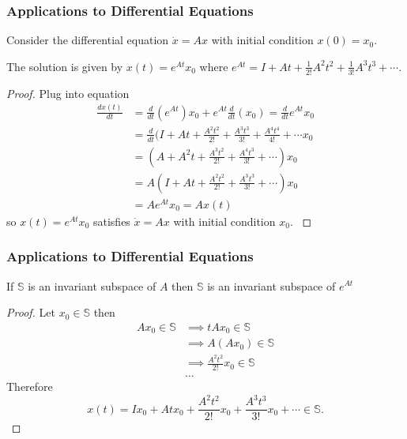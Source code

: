 \documentclass{beamer}
\begin{document}
\begin{frame}\frametitle{Applications to Differential Equations}
	Consider the differential equation 
	\(
		\dot{x} = Ax
	\)
	with initial condition $x(0)=x_0$.
	\begin{lemma}
	 	The solution is given by
	 	\(
	 		x(t) = e^{At}x_0
	 	\)
	 	where $e^{At} = I + At + \frac{1}{2!}A^2t^2 + \frac{1}{3!}A^3t^3 + \cdots$.
	\end{lemma}
	\begin{proof}
		{\footnotesize
		Plug into equation
		\begin{align*}
			\frac{dx(t)}{dt} 
				&= \frac{d}{dt}(e^{At})x_0 + e^{At}\frac{d}{dt}(x_0) 
				= \frac{d}{dt}e^{At}x_0\\
				&= \frac{d}{dt}(I + At + \frac{A^2t^2}{2!} + \frac{A^3t^3}{3!} + \frac{A^4t^4}{4!} + \cdots x_0\\
				&= (A + A^2t + \frac{A^3t^2}{2!} + \frac{A^4t^3}{3!} + \cdots)x_0\\
				&= A(I + At + \frac{A^2t^2}{2!} + \frac{A^3t^3}{3!} + \cdots)x_0\\
				&= Ae^{At}x_0
				= Ax(t)
		\end{align*}
		so $x(t) = e^{At}x_0$ satisfies $\dot{x} = Ax$ with initial condition $x_0$.
		}
	\end{proof}
\end{frame}

\begin{frame}\frametitle{Applications to Differential Equations}
	\begin{lemma}
		If $\mathbb{S}$ is an invariant subspace of $A$ then $\mathbb{S}$ is an invariant subspace of $e^{At}$
	\end{lemma}
	\begin{proof}
		Let $x_0 \in \mathbb{S}$ then
		\begin{align*}
			Ax_0 \in \mathbb{S} 
				&\implies tAx_0 \in \mathbb{S} \\
				&\implies A(Ax_0) \in \mathbb{S} \\
				&\implies \frac{A^2t^2}{2!}x_0 \in \mathbb{S} \\
				&\ldots
		\end{align*}
		Therefore
		\[
			x(t) = Ix_0 + Atx_0 + \frac{A^2t^2}{2!}x_0 + \frac{A^3t^3}{3!}x_0 + \cdots \in \mathbb{S}.
		\]
	\end{proof}
\end{frame}
\end{document}
